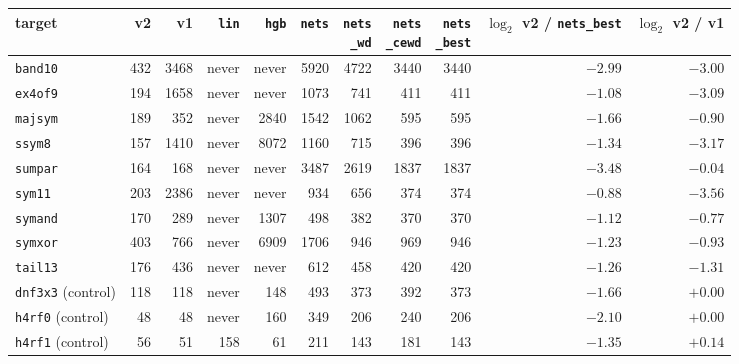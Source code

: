 \begin{tabular}{lrrrrrrrrrr}
\toprule
target & v2 & v1 & \texttt{lin} & \texttt{hgb} & \texttt{nets} & \hd{\texttt{nets}\\\texttt{\_wd}} & \hd{\texttt{nets}\\\texttt{\_cewd}} & \hd{\texttt{nets}\\\texttt{\_best}} & \hd{$\log_2$ v2 /\\\texttt{nets\_best}} & \hd{$\log_2$\\v2 / v1}\\
\midrule
\texttt{band10} & 432 & 3468 & never & never & 5920 & 4722 & 3440 & 3440 & $-2.99$ & $-3.00$\\
\texttt{ex4of9} & 194 & 1658 & never & never & 1073 & 741 & 411 & 411 & $-1.08$ & $-3.09$\\
\texttt{majsym} & 189 & 352 & never & 2840 & 1542 & 1062 & 595 & 595 & $-1.66$ & $-0.90$\\
\texttt{ssym8} & 157 & 1410 & never & 8072 & 1160 & 715 & 396 & 396 & $-1.34$ & $-3.17$\\
\texttt{sumpar} & 164 & 168 & never & never & 3487 & 2619 & 1837 & 1837 & $-3.48$ & $-0.04$\\
\texttt{sym11} & 203 & 2386 & never & never & 934 & 656 & 374 & 374 & $-0.88$ & $-3.56$\\
\texttt{symand} & 170 & 289 & never & 1307 & 498 & 382 & 370 & 370 & $-1.12$ & $-0.77$\\
\texttt{symxor} & 403 & 766 & never & 6909 & 1706 & 946 & 969 & 946 & $-1.23$ & $-0.93$\\
\texttt{tail13} & 176 & 436 & never & never & 612 & 458 & 420 & 420 & $-1.26$ & $-1.31$\\
\midrule
\texttt{dnf3x3} (control) & 118 & 118 & never & 148 & 493 & 373 & 392 & 373 & $-1.66$ & $+0.00$\\
\texttt{h4rf0} (control) & 48 & 48 & never & 160 & 349 & 206 & 240 & 206 & $-2.10$ & $+0.00$\\
\texttt{h4rf1} (control) & 56 & 51 & 158 & 61 & 211 & 143 & 181 & 143 & $-1.35$ & $+0.14$\\
\bottomrule
\end{tabular}
